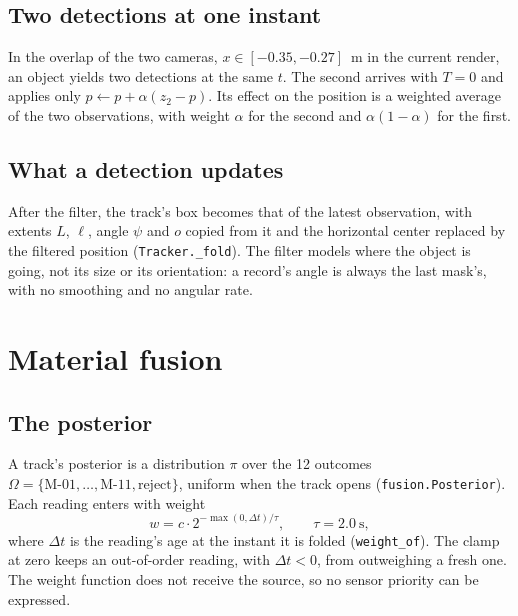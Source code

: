 \documentclass[11pt,a4paper]{article}
\theoremstyle{definition}
\theoremstyle{remark}
\newcommand{\code}[1]{\texttt{#1}}
\begin{document}
\subsection{Two detections at one instant}
\label{sec:same-instant}

In the overlap of the two cameras, $x\in[-0.35, -0.27]$~m in the current render,
an object yields two detections at the same $t$. The second arrives with $T = 0$
and applies only $p \leftarrow p + \alpha(z_2 - p)$. Its effect on the position
is a weighted average of the two observations, with weight $\alpha$ for the
second and $\alpha(1-\alpha)$ for the first.

\subsection{What a detection updates}

After the filter, the track's box becomes that of the latest observation, with
extents $L$, $\ell$, angle $\psi$ and $o$ copied from it and the horizontal
center replaced by the filtered position (\code{Tracker.\_fold}). The filter
models where the object is going, not its size or its orientation: a record's
angle is always the last mask's, with no smoothing and no angular rate.

\section{Material fusion}
\label{sec:material}

\subsection{The posterior}

A track's posterior is a distribution $\pi$ over the 12 outcomes
$\Omega = \{\text{M-01},\dots,\text{M-11},\text{reject}\}$, uniform when the
track opens (\code{fusion.Posterior}). Each reading enters with weight
\begin{equation}
\label{eq:weight}
w = c\cdot 2^{-\max(0,\Delta t)/\tau},\qquad \tau = 2.0\ \text{s},
\end{equation}
where $\Delta t$ is the reading's age at the instant it is folded
(\code{weight\_of}). The clamp at zero keeps an out-of-order reading, with
$\Delta t<0$, from outweighing a fresh one. The weight function does not
receive the source, so no sensor priority can be expressed.
\end{document}
